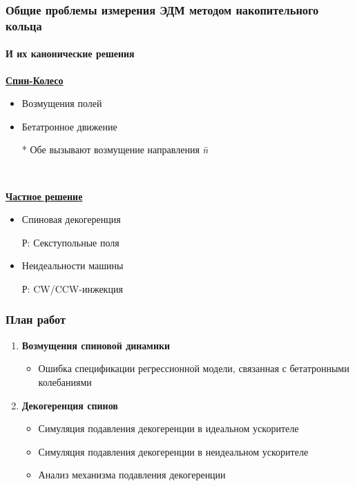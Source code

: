 \documentclass[14pt]{beamer}
\begin{document}
\begin{frame}\frametitle{Общие проблемы измерения ЭДМ методом накопительного кольца}\framesubtitle{И их канонические решения}
\begin{minipage}[t]{.5\linewidth}
	\underline{\textbf{Спин-Колесо}} %
	\begin{itemize}
		\item Возмущения полей
		\item Бетатронное движение
		\item[*] Обе вызывают возмущение направления $\bar n$
	\end{itemize}
\end{minipage}~%
\begin{minipage}[t]{.5\linewidth}
	\underline{\textbf{Частное решение}}
	\begin{itemize}
		\item Спиновая декогеренция
		\item[Р:] Секступольные поля
		\item Неидеальности машины
		\item[Р:] CW/CCW-инжекция
	\end{itemize}
\end{minipage}
\end{frame}
\begin{frame}
\frametitle{План работ}
\begin{enumerate}[<+->]
  \item \textbf{Возмущения спиновой динамики}
  \begin{itemize}
  	\item Ошибка спецификации регрессионной модели, связанная с бетатронными колебаниями
  \end{itemize}
  \item \textbf{Декогеренция спинов}
  \begin{itemize}
    \item Симуляция подавления декогеренции в идеальном ускорителе
    \item Симуляция подавления декогеренции в неидеальном ускорителе
    \item Анализ механизма подавления декогеренции
  \end{itemize}
\end{enumerate}
\end{frame}
\end{document}
